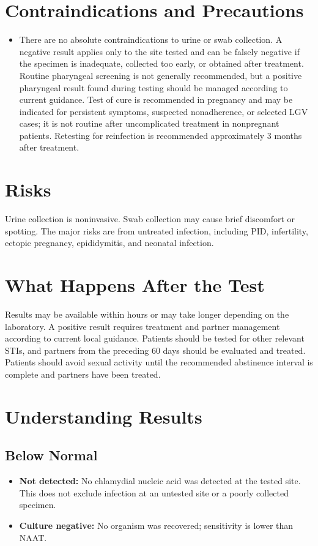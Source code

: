 \section*{Contraindications and Precautions}
\begin{itemize}
  \item There are no absolute contraindications to urine or swab collection. A negative result applies only to the site tested and can be falsely negative if the specimen is inadequate, collected too early, or obtained after treatment. Routine pharyngeal screening is not generally recommended, but a positive pharyngeal result found during testing should be managed according to current guidance. Test of cure is recommended in pregnancy and may be indicated for persistent symptoms, suspected nonadherence, or selected LGV cases; it is not routine after uncomplicated treatment in nonpregnant patients. Retesting for reinfection is recommended approximately 3 months after treatment.
\end{itemize}
\section*{Risks}
Urine collection is noninvasive. Swab collection may cause brief discomfort or spotting. The major risks are from untreated infection, including PID, infertility, ectopic pregnancy, epididymitis, and neonatal infection.

\section*{What Happens After the Test}
Results may be available within hours or may take longer depending on the laboratory. A positive result requires treatment and partner management according to current local guidance. Patients should be tested for other relevant STIs, and partners from the preceding 60 days should be evaluated and treated. Patients should avoid sexual activity until the recommended abstinence interval is complete and partners have been treated.

\section*{Understanding Results}
\subsection*{Below Normal}
\begin{itemize}
  \item \textbf{Not detected:} No chlamydial nucleic acid was detected at the tested site. This does not exclude infection at an untested site or a poorly collected specimen.
  \item \textbf{Culture negative:} No organism was recovered; sensitivity is lower than NAAT.
\end{itemize}

